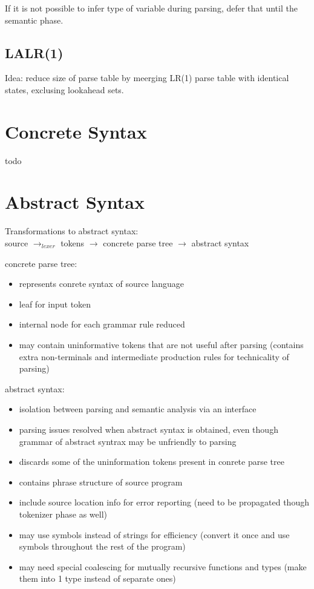 \documentclass[8pt]{extarticle}
\begin{document}
\begin{multicols*}{2}
  If it is not possible to infer type of variable during parsing, defer that until the semantic phase.
  
  \subsection{LALR(1)}
  Idea: reduce size of parse table by meerging LR(1) parse table with identical states, exclusing lookahead sets.

  \section{Concrete Syntax}
  todo
  \vfill\null
  \columnbreak
  
  \section{Abstract Syntax}
  Transformations to abstract syntax:\\
  source $\rightarrow_{lexer}$ tokens $\rightarrow$ concrete parse tree $\rightarrow$ abstract syntax

  concrete parse tree:
  \begin{itemize}
  \item represents conrete syntax of source language
  \item leaf for input token
  \item internal node for each grammar rule reduced
  \item may contain uninformative tokens that are not useful after parsing (contains extra non-terminals and intermediate production rules for technicality of parsing)
  \end{itemize}

  abstract syntax:
  \begin{itemize}
  \item isolation between parsing and semantic analysis via an interface
  \item parsing issues resolved when abstract syntax is obtained, even though grammar of abstract syntrax may be unfriendly to parsing
  \item discards some of the uninformation tokens present in conrete parse tree
  \item contains phrase structure of source program
  \item include source location info for error reporting (need to be propagated though tokenizer phase as well)
  \item may use symbols instead of strings for efficiency (convert it once and use symbols throughout the rest of the program)
  \item may need special coalescing for mutually recursive functions and types (make them into 1 type instead of separate ones)
  \end{itemize}
  

\end{multicols*}
\end{document}
